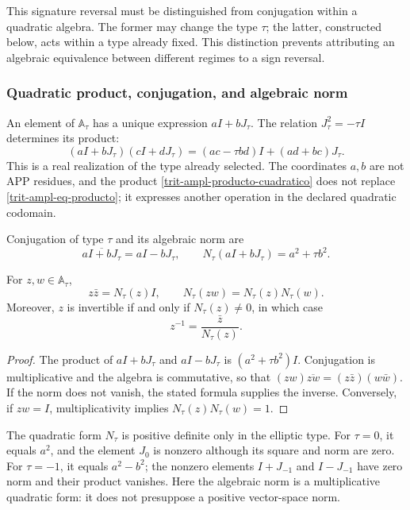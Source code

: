 This signature reversal must be distinguished from conjugation within a
quadratic algebra. The former may change the type \(\tau\); the latter,
constructed below, acts within a type already fixed. This distinction
prevents attributing an algebraic equivalence between different regimes
to a sign reversal.

\subsubsection{Quadratic product, conjugation, and algebraic norm}
\label{trit-ampl-norma}

An element of \(\mathbb A_\tau\) has a unique expression \(aI+bJ_\tau\).
The relation \(J_\tau^2=-\tau I\) determines its product:
\begin{equation}
 (aI+bJ_\tau)(cI+dJ_\tau)
   =(ac-\tau bd)I+(ad+bc)J_\tau.
 \label{trit-ampl-producto-cuadratico}
\end{equation}
This is a real realization of the type already selected. The coordinates
\(a,b\) are not APP residues, and the product
\eqref{trit-ampl-producto-cuadratico} does not replace
\eqref{trit-ampl-eq-producto}; it expresses another operation in the
declared quadratic codomain.

\begin{definition}
\label{trit-ampl-def-norma}
Conjugation of type \(\tau\) and its algebraic norm are
\[
 \overline{aI+bJ_\tau}=aI-bJ_\tau,\qquad
 N_\tau(aI+bJ_\tau)=a^2+\tau b^2.
\]
\end{definition}

\begin{proposition}
\label{trit-ampl-prop-norma}
For \(z,w\in\mathbb A_\tau\),
\[
 z\bar z=N_\tau(z)I,\qquad
 N_\tau(zw)=N_\tau(z)N_\tau(w).
\]
Moreover, \(z\) is invertible if and only if \(N_\tau(z)\ne0\), in which case
\[
 z^{-1}=\frac{\bar z}{N_\tau(z)}.
\]
\end{proposition}
\begin{proof}
The product of \(aI+bJ_\tau\) and \(aI-bJ_\tau\) is
\((a^2+\tau b^2)I\). Conjugation is multiplicative and the algebra is
commutative, so that
\((zw)\overline{zw}=(z\bar z)(w\bar w)\). If the norm does not vanish,
the stated formula supplies the inverse. Conversely, if \(zw=I\),
multiplicativity implies \(N_\tau(z)N_\tau(w)=1\).
\end{proof}

The quadratic form \(N_\tau\) is positive definite only in the elliptic type.
For \(\tau=0\), it equals \(a^2\), and the element \(J_0\) is nonzero although
its square and norm are zero. For \(\tau=-1\), it equals \(a^2-b^2\);
the nonzero elements \(I+J_{-1}\) and \(I-J_{-1}\) have zero norm and
their product vanishes. Here the algebraic norm is a multiplicative
quadratic form: it does not presuppose a positive vector-space norm.


